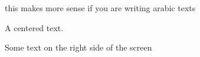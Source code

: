 \begin{flushleft}
	this makes more sense if you are writing arabic texts
\end{flushleft}
\begin{center}
	A centered text.
\end{center}
\begin{flushright}
	Some text on the right side of the screen
\end{flushright}
